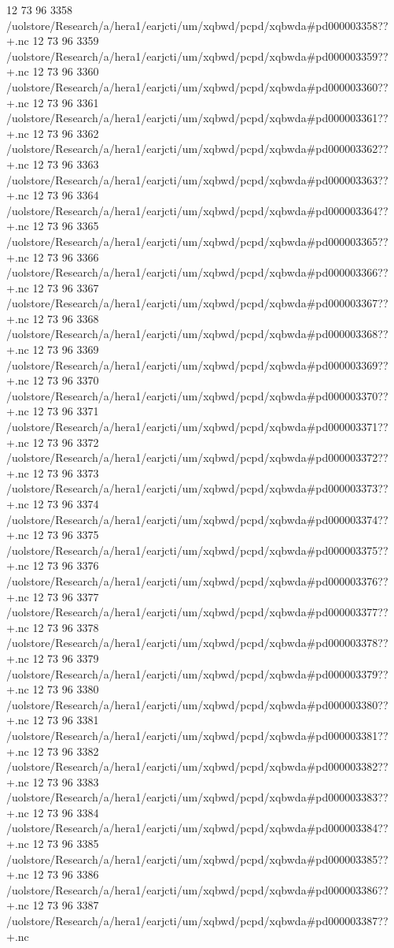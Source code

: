 12 73 96
3358
/uolstore/Research/a/hera1/earjcti/um/xqbwd/pcpd/xqbwda#pd000003358??+.nc
12 73 96
3359
/uolstore/Research/a/hera1/earjcti/um/xqbwd/pcpd/xqbwda#pd000003359??+.nc
12 73 96
3360
/uolstore/Research/a/hera1/earjcti/um/xqbwd/pcpd/xqbwda#pd000003360??+.nc
12 73 96
3361
/uolstore/Research/a/hera1/earjcti/um/xqbwd/pcpd/xqbwda#pd000003361??+.nc
12 73 96
3362
/uolstore/Research/a/hera1/earjcti/um/xqbwd/pcpd/xqbwda#pd000003362??+.nc
12 73 96
3363
/uolstore/Research/a/hera1/earjcti/um/xqbwd/pcpd/xqbwda#pd000003363??+.nc
12 73 96
3364
/uolstore/Research/a/hera1/earjcti/um/xqbwd/pcpd/xqbwda#pd000003364??+.nc
12 73 96
3365
/uolstore/Research/a/hera1/earjcti/um/xqbwd/pcpd/xqbwda#pd000003365??+.nc
12 73 96
3366
/uolstore/Research/a/hera1/earjcti/um/xqbwd/pcpd/xqbwda#pd000003366??+.nc
12 73 96
3367
/uolstore/Research/a/hera1/earjcti/um/xqbwd/pcpd/xqbwda#pd000003367??+.nc
12 73 96
3368
/uolstore/Research/a/hera1/earjcti/um/xqbwd/pcpd/xqbwda#pd000003368??+.nc
12 73 96
3369
/uolstore/Research/a/hera1/earjcti/um/xqbwd/pcpd/xqbwda#pd000003369??+.nc
12 73 96
3370
/uolstore/Research/a/hera1/earjcti/um/xqbwd/pcpd/xqbwda#pd000003370??+.nc
12 73 96
3371
/uolstore/Research/a/hera1/earjcti/um/xqbwd/pcpd/xqbwda#pd000003371??+.nc
12 73 96
3372
/uolstore/Research/a/hera1/earjcti/um/xqbwd/pcpd/xqbwda#pd000003372??+.nc
12 73 96
3373
/uolstore/Research/a/hera1/earjcti/um/xqbwd/pcpd/xqbwda#pd000003373??+.nc
12 73 96
3374
/uolstore/Research/a/hera1/earjcti/um/xqbwd/pcpd/xqbwda#pd000003374??+.nc
12 73 96
3375
/uolstore/Research/a/hera1/earjcti/um/xqbwd/pcpd/xqbwda#pd000003375??+.nc
12 73 96
3376
/uolstore/Research/a/hera1/earjcti/um/xqbwd/pcpd/xqbwda#pd000003376??+.nc
12 73 96
3377
/uolstore/Research/a/hera1/earjcti/um/xqbwd/pcpd/xqbwda#pd000003377??+.nc
12 73 96
3378
/uolstore/Research/a/hera1/earjcti/um/xqbwd/pcpd/xqbwda#pd000003378??+.nc
12 73 96
3379
/uolstore/Research/a/hera1/earjcti/um/xqbwd/pcpd/xqbwda#pd000003379??+.nc
12 73 96
3380
/uolstore/Research/a/hera1/earjcti/um/xqbwd/pcpd/xqbwda#pd000003380??+.nc
12 73 96
3381
/uolstore/Research/a/hera1/earjcti/um/xqbwd/pcpd/xqbwda#pd000003381??+.nc
12 73 96
3382
/uolstore/Research/a/hera1/earjcti/um/xqbwd/pcpd/xqbwda#pd000003382??+.nc
12 73 96
3383
/uolstore/Research/a/hera1/earjcti/um/xqbwd/pcpd/xqbwda#pd000003383??+.nc
12 73 96
3384
/uolstore/Research/a/hera1/earjcti/um/xqbwd/pcpd/xqbwda#pd000003384??+.nc
12 73 96
3385
/uolstore/Research/a/hera1/earjcti/um/xqbwd/pcpd/xqbwda#pd000003385??+.nc
12 73 96
3386
/uolstore/Research/a/hera1/earjcti/um/xqbwd/pcpd/xqbwda#pd000003386??+.nc
12 73 96
3387
/uolstore/Research/a/hera1/earjcti/um/xqbwd/pcpd/xqbwda#pd000003387??+.nc
